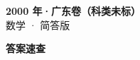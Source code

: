 \documentclass[zihao=-4, a4paper]{ctexart}
\begin{document}
\begin{center}
  {\Large\bfseries 2000 年·广东卷（科类未标）}\\[4pt]
  {\large 数学 · 简答版}
\end{center}
\medskip
{}

\clearpage
{}
\begin{center}{\Large\bfseries 答案速查}\end{center}
\medskip

\end{document}
